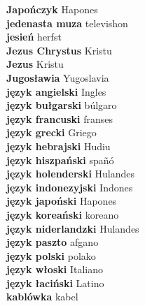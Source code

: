 \textbf{ Japończyk  } Hapones \\
\textbf{ jedenasta muza  } televishon \\
\textbf{ jesień  } herfst \\
\textbf{ Jezus Chrystus  } Kristu \\
\textbf{ Jezus  } Kristu \\
\textbf{ Jugosławia  } Yugoslavia \\
\textbf{ język angielski  } Ingles \\
\textbf{ język bułgarski  } búlgaro \\
\textbf{ język francuski  } franses \\
\textbf{ język grecki  } Griego \\
\textbf{ język hebrajski  } Hudiu \\
\textbf{ język hiszpański  } spañó \\
\textbf{ język holenderski  } Hulandes \\
\textbf{ język indonezyjski  } Indones \\
\textbf{ język japoński  } Hapones \\
\textbf{ język koreański  } koreano \\
\textbf{ język niderlandzki  } Hulandes \\
\textbf{ język paszto  } afgano \\
\textbf{ język polski  } polako \\
\textbf{ język włoski  } Italiano \\
\textbf{ język łaciński  } Latino \\
\textbf{ kablówka  } kabel \\
